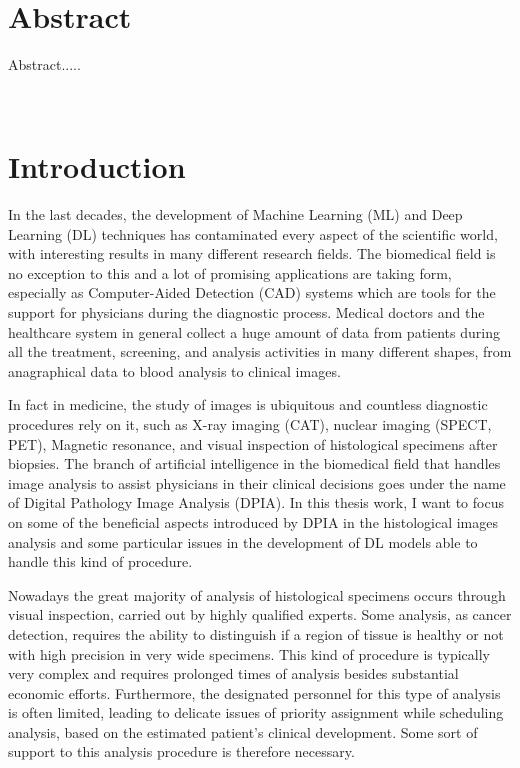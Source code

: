 \documentclass[12pt,a4paper]{report}
\begin{document}
    \newpage \ \newpage

    \chapter*{Abstract}
Abstract.....

    \clearpage

    \renewcommand{\contentsname}{Table of Contents}
    \renewcommand\cftchapafterpnum{\par\addvspace{6pt}}
    \renewcommand\cftsecafterpnum{\par\addvspace{4pt}}
    \tableofcontents{}
    \newpage \ \newpage

    \chapter*{Introduction}
\label{chap:intro}
In the last decades, the development of Machine Learning (ML) and Deep Learning (DL) techniques has contaminated every aspect of the scientific world, with interesting results in many different research fields. The biomedical field is no exception to this and a lot of promising applications are taking form, especially as Computer-Aided Detection (CAD) systems which are tools for the support for physicians during the diagnostic process. Medical doctors and the healthcare system in general collect a huge amount of data from patients during all the treatment, screening, and analysis activities in many different shapes, from anagraphical data to blood analysis to clinical images.

In fact in medicine, the study of images is ubiquitous and countless diagnostic procedures rely on it, such as X-ray imaging (CAT), nuclear imaging (SPECT, PET), Magnetic resonance, and visual inspection of histological specimens after biopsies. The branch of artificial intelligence in the biomedical field that handles image analysis to assist physicians in their clinical decisions goes under the name of Digital Pathology Image Analysis (DPIA).
In this thesis work, I want to focus on some of the beneficial aspects introduced by DPIA in the histological images analysis and some particular issues in the development of DL models able to handle this kind of procedure.

Nowadays the great majority of analysis of histological specimens occurs through visual inspection, carried out by highly qualified experts. Some analysis, as cancer detection, requires the ability to distinguish if a region of tissue is healthy or not with high precision in very wide specimens. This kind of procedure is typically very complex and requires prolonged times of analysis besides substantial economic efforts. Furthermore, the designated personnel for this type of analysis is often limited, leading to delicate issues of priority assignment while scheduling analysis, based on the estimated patient's clinical development. Some sort of support to this analysis procedure is therefore necessary.
\end{document}

